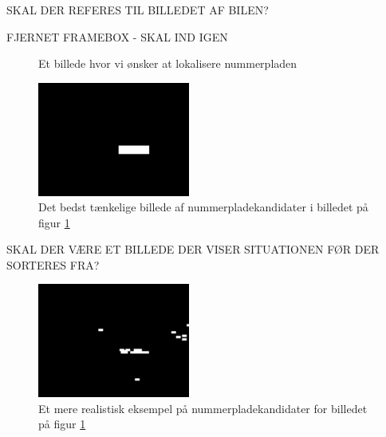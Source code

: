 SKAL DER REFERES TIL BILLEDET AF BILEN?

FJERNET FRAMEBOX - SKAL IND IGEN

\begin{figure}[htp]
\centering
{}
\caption{Et billede hvor vi ønsker at lokalisere nummerpladen}
\label{fig:input_billede}
\end{figure}



\begin{figure}[htp]
\centering
\includegraphics[width=5cm]{system/illu/binary_ideal.png} 
\caption{Det bedst tænkelige billede af nummerpladekandidater i billedet på figur \ref{fig:input_billede}}
\label{fig:binary_ideal}
\end{figure}

SKAL DER VÆRE ET BILLEDE DER VISER SITUATIONEN FØR DER SORTERES FRA?

\begin{figure}[htp]
\centering
\includegraphics[width=5cm]{system/illu/binary_real.png} 
\caption{Et mere realistisk eksempel på nummerpladekandidater for billedet på figur \ref{fig:input_billede}}
\label{fig:binary_real}
\end{figure}



